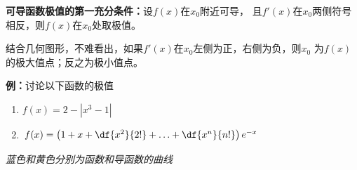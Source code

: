 \begin{thx}
	{\bf 可导函数极值的第一充分条件：}设$f(x)$在$x_0$附近可导，
	且$f'(x)$在$x_0$两侧符号相反，则$f(x)$在$x_0$处取极值。
\end{thx}

结合几何图形，不难看出，如果$f'(x)$在$x_0$左侧为正，右侧为负，则$x_0$
为$f(x)$的极大值点；反之为极小值点。

{\bf 例：}讨论以下函数的极值
\begin{enumerate}[(1)]
  \setlength{\itemindent}{1cm}
  \item $f(x)=2-|x^3-1|$
  \item $f(x)=\left(1+x+\df{x^2}{2!}+\ldots+\df{x^n}{n!}\right)e^{-x}$ 
\end{enumerate}

\begin{center}
	\quad
	
	{\it 蓝色和黄色分别为函数和导函数的曲线}
\end{center}

